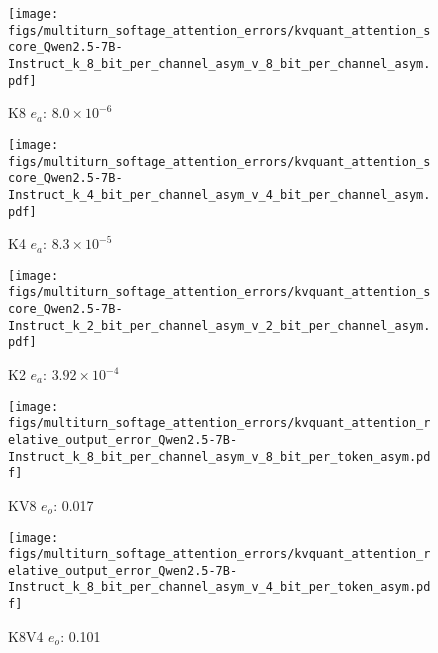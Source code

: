 %
%
\begin{figure*}
    \centering
    \begin{subfigure}{0.25\columnwidth}
    \texttt{[image: figs/multiturn\_softage\_attention\_errors/kvquant\_attention\_score\_Qwen2.5-7B-Instruct\_k\_8\_bit\_per\_channel\_asym\_v\_8\_bit\_per\_channel\_asym.pdf]}
    \caption{K8 $e_a$: $8.0\times 10^{-6}$}
    \label{fig:kvcache_simulated_quant_attention_score_error_layer_wise_k8_per_channel_asym_Qwen2.5-7B-Instruct_multirurn_softage}
    \end{subfigure}
    \begin{subfigure}{0.25\columnwidth}
    \texttt{[image: figs/multiturn\_softage\_attention\_errors/kvquant\_attention\_score\_Qwen2.5-7B-Instruct\_k\_4\_bit\_per\_channel\_asym\_v\_4\_bit\_per\_channel\_asym.pdf]}
    \caption{K4 $e_a$: $8.3\times 10^{-5}$}
    \label{fig:kvcache_simulated_quant_attention_score_error_layer_wise_k4_per_channel_asym_Qwen2.5-7B-Instruct_multirurn_softage}
    \end{subfigure}
    \begin{subfigure}{0.25\columnwidth}
    \texttt{[image: figs/multiturn\_softage\_attention\_errors/kvquant\_attention\_score\_Qwen2.5-7B-Instruct\_k\_2\_bit\_per\_channel\_asym\_v\_2\_bit\_per\_channel\_asym.pdf]}
    \caption{K2 $e_a$: $3.92\times 10^{-4}$}
    \label{fig:kvcache_simulated_quant_attention_score_error_layer_wise_k2_per_channel_asym_Qwen2.5-7B-Instruct_multirurn_softage}
    \end{subfigure}
    \begin{subfigure}{0.25\columnwidth}
    \texttt{[image: figs/multiturn\_softage\_attention\_errors/kvquant\_attention\_relative\_output\_error\_Qwen2.5-7B-Instruct\_k\_8\_bit\_per\_channel\_asym\_v\_8\_bit\_per\_token\_asym.pdf]}
    \caption{KV8 $e_o$: 0.017}
    \label{fig:kvcache_simulated_quant_error_layer_wise_k8_per_channel_v8_per_token_asym_Qwen2.5-7B-Instruct_multirurn_softage}
    \end{subfigure}
    \begin{subfigure}{0.25\columnwidth}
    \texttt{[image: figs/multiturn\_softage\_attention\_errors/kvquant\_attention\_relative\_output\_error\_Qwen2.5-7B-Instruct\_k\_8\_bit\_per\_channel\_asym\_v\_4\_bit\_per\_token\_asym.pdf]}
    \caption{K8V4 $e_o$: 0.101}
    \label{fig:kvcache_simulated_quant_error_layer_wise_k8_bit_per_channel_asym_v4_per_token_asym_Qwen2.5-7B-Instruct_multirurn_softage}

\end{subfigure}
\end{figure*}
